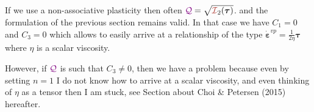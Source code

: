 \begin{remark}
If we use a non-associative plasticity then often $\QQQ=\sqrt{{\III}_2(\bm\tau)}$.
and the formulation of the previous section remains valid. In that case 
we have $C_1=0$ and $C_3=0$ which allows to easily arrive at a relationship 
of the type $\dot{\bm\varepsilon}^{vp} = \frac{1}{2\eta} \bm\tau$ where 
$\eta$ is a scalar viscosity. 

However, if ${\color{violet}\cal Q}$ is such that $C_3\neq 0$, then we have a problem because 
even by setting $n=1$ I do not know how to arrive at a scalar viscosity, 
and even thinking of $\eta$ as a tensor then I am stuck, see Section about 
Choi \& Petersen (2015) hereafter.
\end{remark}


